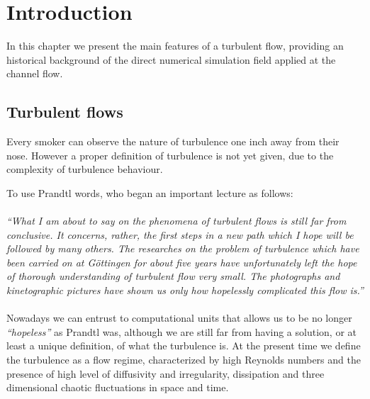 \chapter{Introduction}

In this chapter we present the main features of a turbulent flow, providing an historical background of the direct numerical simulation field applied at the channel flow.

\section{Turbulent flows}
Every smoker can observe the nature of turbulence one inch away from their nose.
However a proper definition of turbulence is not yet given, due to the complexity of turbulence behaviour. \par
To use Prandtl words, who began an important lecture as follows: \\~\\
\emph{``What I am about to say on the phenomena of turbulent flows is still far from conclusive. It concerns, rather, the first steps in a new path which I hope will be followed by many others. The researches on the problem of turbulence which have been carried on at G\"{o}ttingen for about five years have unfortunately left the hope of thorough understanding of turbulent flow very small. The photographs and kinetographic pictures have shown us only how hopelessly complicated this flow is.''} \\~\\

Nowadays we can entrust to computational units that allows us to be no longer \emph{``hopeless''} as Prandtl was, although we are still far from having a solution, or at least a unique definition, of what the turbulence is. 
At the present time we define the turbulence as a flow regime, characterized by high Reynolds numbers and the presence of high level of diffusivity and irregularity, dissipation and three dimensional chaotic fluctuations in space and time\cite{turbulence:def}.


